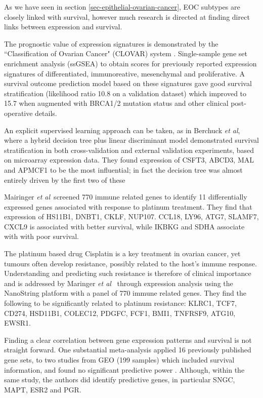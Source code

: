 \documentclass[draft, tikz, 12pt,a4paper,oneside,fleqn]{article}
\newcommand{\etal}{{\em et al\/}}
\begin{document}
As we have seen in section \ref{sec-epithelial-ovarian-cancer}, EOC subtypes are closely linked with survival, however much research is directed at finding direct links between expression and survival.

The prognostic value of expression signatures is demonstrated by the ``Classification of Ovarian Cancer" (CLOVAR) system \cite{Verhaak2013}.  
Single-sample gene set enrichment analysis (ssGSEA) to obtain scores for previously reported expression signatures of differentiated, immunoreative, mesenchymal and proliferative.  
A survival outcome prediction model based on these signatures gave good survival stratification (likelihood ratio 10.8 on a validation dataset) which improved to 15.7 when augmented with BRCA1/2 mutation status and other clinical post-operative details.

An explicit supervised learning approach can be taken, as in Berchuck \etal, where a hybrid decision tree plus linear discriminant model demonstrated survival stratification in both cross-validation and external validation experiments, based on microarray expression data.   
They found expression of CSFT3, ABCD3, MAL and APMCF1 to be the most influential; in fact the decision tree was almost entirely driven by the first two of these

Mairinger \etal\ screened 770 immune related genes to identify 11 differentially expressed genes associated with response to platinum treatment.  
They find that expression of HS11B1, DNBT1, CKLF, NUP107. CCL18, LY96, ATG7, SLAMF7, CXCL9 is associated with better survival, while IKBKG and SDHA associate with with poor survival.

The platinum based drug Cisplatin is a key treatment in ovarian cancer, yet tumours often develop resistance, possibly related to the host's immune response.  
Understanding and predicting such resistance is therefore of clinical importance and is addressed by Maringer \etal\ \cite{Mairinger2019} through expression analysis using the NanoString platform with a panel of 770 immune related genes.   
They find the following to be significantly related to platinum resistance: KLRC1, TCF7, CD274, HSD11B1, COLEC12, PDGFC, FCF1, BMI1, TNFRSF9, ATG10, EWSR1.

Finding a clear correlation between gene expression patterns and survival is not straight forward.  
One substantial meta-analysis applied 16 previously published gene sets, to two studies from GEO (199 samples) which included survival information, and found no significant predictive power \cite{Fekete2012a}.  
Although, within the same study, the authors did identify predictive genes, in particular SNGC, MAPT, ESR2 and PGR.
\end{document}
